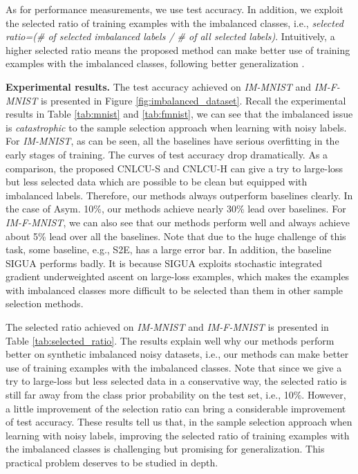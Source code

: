 \documentclass[11pt]{article}
\begin{document}
As for performance measurements, we use test accuracy. In addition, we exploit the selected ratio of training examples with the imbalanced classes, i.e., \textit{selected ratio=(\# of selected imbalanced labels / \# of all selected labels)}. Intuitively, a higher selected ratio means the proposed method can make better use of training examples with the imbalanced classes, following better generalization \citep{kang2020decoupling}.


\textbf{Experimental results.} The test accuracy achieved on \textit{IM-MNIST} and \textit{IM-F-MNIST} is presented in Figure \ref{fig:imbalanced_dataset}. Recall the experimental results in Table \ref{tab:mnist} and \ref{tab:fmnist}, we can see that the imbalanced issue is \textit{catastrophic} to the sample selection approach when learning with noisy labels. For \textit{IM-MNIST}, as can be seen, all the baselines have serious overfitting in the early stages of training. The curves of test accuracy drop dramatically. As a comparison, the proposed CNLCU-S and CNLCU-H can give a try to large-loss but less selected data which are possible to be clean but equipped with imbalanced labels. Therefore, our methods always outperform baselines clearly. In the case of Asym. 10\%, our methods achieve nearly 30\% lead over baselines. For \textit{IM-F-MNIST}, we can also see that our methods perform well and always achieve about 5\% lead over all the baselines. Note that due to the huge challenge of this task, some baseline, e.g., S2E, has a large error bar. In addition, the baseline SIGUA performs badly. It is because SIGUA exploits stochastic integrated gradient underweighted ascent on large-loss examples, which makes the examples with imbalanced classes more difficult to be selected than them in other sample selection methods.

The selected ratio achieved on \textit{IM-MNIST} and \textit{IM-F-MNIST} is presented in Table \ref{tab:selected_ratio}. The results explain well why our methods perform better on synthetic imbalanced noisy datasets, i.e., our methods can make better use of training examples with the imbalanced classes. Note that since we give a try to large-loss but less selected data in a conservative way, the selected ratio is still far away from the class prior probability on the test set, i.e., 10\%. However, a little improvement of the selection ratio can bring a considerable improvement of test accuracy. These results tell us that, in the sample selection approach when learning with noisy labels, improving the selected ratio of training examples with the imbalanced classes is challenging but promising for generalization. This practical problem deserves to be studied in depth. 
\end{document}
